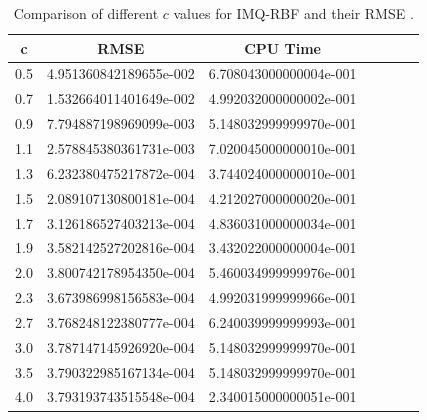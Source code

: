 \documentclass[12pt]{article}
\numberwithin{equation}{section} %
\begin{document}
\newpage
\begin{table}[h]
\centering
\begin{tabular}{|c|c|c|c|c|c|c|}
  \hline
  c &  RMSE & CPU Time \\
  \hline
  0.5 & 4.951360842189655e-002 & 6.708043000000004e-001   \\
  0.7 & 1.532664011401649e-002  &4.992032000000002e-001  \\
  0.9 &7.794887198969099e-003   & 5.148032999999970e-001  \\
  1.1 &2.578845380361731e-003   &7.020045000000010e-001 \\
  1.3 &6.232380475217872e-004  &3.744024000000010e-001 \\
  1.5 &2.089107130800181e-004   &4.212027000000020e-001  \\
  1.7 &3.126186527403213e-004   & 4.836031000000034e-001  \\
  1.9 &3.582142527202816e-004   &3.432022000000004e-001    \\
  2.0 & 3.800742178954350e-004  &5.460034999999976e-001  \\
  2.3& 3.673986998156583e-004&4.992031999999966e-001\\
  2.7&3.768248122380777e-004&6.240039999999993e-001\\
  3.0&3.787147145926920e-004  &5.148032999999970e-001\\
  3.5&3.790322985167134e-004&5.148032999999970e-001\\
  4.0&3.793193743515548e-004 &2.340015000000051e-001\\

  \hline

\end{tabular}
  \caption{Comparison of different $c$ values for IMQ-RBF and their RMSE .}\label{Tab_1DFinal}
\end{table}

\newpage
\end{document}
